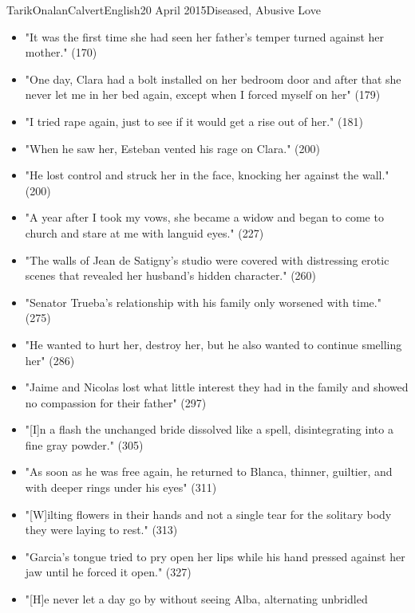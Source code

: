 \documentclass[12pt,a4paper]{article}
\begin{document}
\begin{mla}{Tarik}{Onalan}{Calvert}{English}{20 April 2015}{Diseased, Abusive Love}
\begin{itemize}
                \item "It was the first time she had seen her father's temper turned against
                    her mother." (170)
                \item "One day, Clara had a bolt installed on her bedroom door and after that
                    she never let me in her bed again, except when I forced myself on her" (179)
                \item "I tried rape again, just to see if it would get a rise out of her." (181)
                \item "When he saw her, Esteban vented his rage on Clara." (200)
                \item "He lost control and struck her in the face, knocking her against
                    the wall." (200)
                \item "A year after I took my vows, she became a widow and began to come
                    to church and stare at me with languid eyes." (227)
                \item "The walls of Jean de Satigny's studio were covered with distressing
                    erotic scenes that revealed her husband's hidden character." (260)
                \item "Senator Trueba's relationship with his family only worsened with
                    time." (275)
                \item "He wanted to hurt her, destroy her, but he also wanted to continue
                    smelling her" (286)
                \item "Jaime and Nicolas lost what little interest they had in the family
                    and showed no compassion for their father" (297)
                \item "[I]n a flash the unchanged bride dissolved like a spell, disintegrating
                    into a fine gray powder." (305)
                \item "As soon as he was free again, he returned to Blanca, thinner, guiltier,
                    and with deeper rings under his eyes" (311)
                \item "[W]ilting flowers in their hands and not a single tear for the solitary
                    body they were laying to rest." (313)
                \item "Garcia's tongue tried to pry open her lips while his hand pressed
                    against her jaw until he forced it open." (327)
                \item "[H]e never let a day go by without seeing Alba, alternating unbridled

\end{itemize}
\end{mla}
\end{document}
